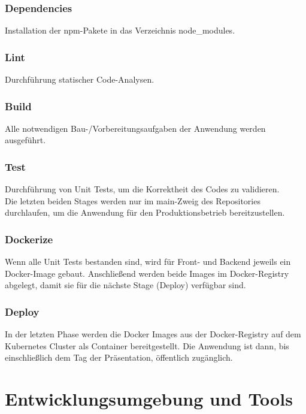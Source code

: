 \documentclass[letterpaper, 10 pt, conference]{ieeeconf}
\begin{document}
\subsubsection{Dependencies}

Installation der npm-Pakete in das Verzeichnis node\_modules.

\subsubsection{Lint}

Durchführung statischer Code-Analysen.

\subsubsection{Build}

Alle notwendigen Bau-/Vorbereitungsaufgaben der Anwendung werden ausgeführt.

\subsubsection{Test}

Durchführung von Unit Tests, um die Korrektheit des Codes zu validieren.  \\

Die letzten beiden Stages werden nur im main-Zweig des Repositories durchlaufen, um die Anwendung für den Produktionsbetrieb bereitzustellen.

\subsubsection{Dockerize}

Wenn alle Unit Tests bestanden sind, wird für Front- und Backend jeweils ein Docker-Image gebaut. Anschließend werden beide Images im Docker-Registry abgelegt, damit sie für die nächste Stage (Deploy) verfügbar sind.

\subsubsection{Deploy}

In der letzten Phase werden die Docker Images aus der Docker-Registry auf dem Kubernetes Cluster als Container bereitgestellt. Die Anwendung ist dann,  bis einschließlich dem Tag der Präsentation, öffentlich zugänglich.


\section{Entwicklungsumgebung und Tools}
\end{document}

